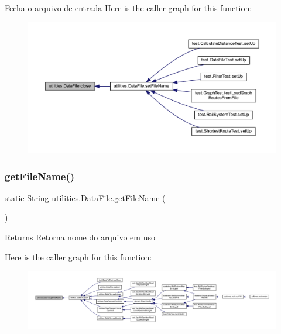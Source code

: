 Fecha o arquivo de entrada Here is the caller graph for this function\+:\nopagebreak
\begin{figure}[H]
\begin{center}
\leavevmode
\includegraphics[width=350pt]{classutilities_1_1_data_file_a4f113f0a5f50902308585d1f11988ec7_icgraph}
\end{center}
\end{figure}
\mbox{\label{classutilities_1_1_data_file_ae5e95d9019f786414f891e2afc966381}} 
\subsubsection{\texorpdfstring{get\+File\+Name()}{getFileName()}}
{\footnotesize\ttfamily static String utilities.\+Data\+File.\+get\+File\+Name (\begin{DoxyParamCaption}{ }\end{DoxyParamCaption})\hspace{0.3cm}{\ttfamily [static]}}

\begin{DoxyReturn}{Returns}
Retorna nome do arquivo em uso 
\end{DoxyReturn}
Here is the caller graph for this function\+:\nopagebreak
\begin{figure}[H]
\begin{center}
\leavevmode
\includegraphics[width=350pt]{classutilities_1_1_data_file_ae5e95d9019f786414f891e2afc966381_icgraph}
\end{center}
\end{figure}
\mbox{\label{classutilities_1_1_data_file_aa53fb6327a320f458fd8314751e241c9}} 
